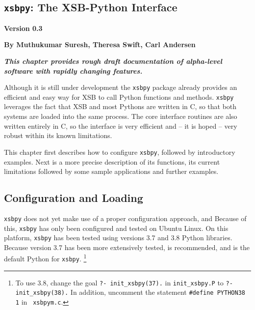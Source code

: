 \newcommand{\xsbpyversion}{Version 0.3}

\begin{center}
\chapter[XSB and Python]{{\tt xsbpy}: The XSB-Python Interface} \label{chap:xsbpy}
\end{center}

\vspace*{-.30in} 
\begin{center}
{\Large {\bf  \xsbpyversion}}
\end{center}

\begin{center}
  {\Large {\bf By Muthukumar Suresh, Theresa Swift, Carl Andersen}}
\end{center}

\noindent
{\large {\bf {\em This chapter provides rough draft documentation of
      alpha-level software with rapidly changing features.}}}

%

Although it is still under development the {\tt xsbpy} package already
provides an efficient and easy way for XSB to call Python functions
and methods.  {\tt xsbpy} leverages the fact that XSB and most Pythons
are written in C, so that both systems are loaded into the same
process. The core interface routines are also written entirely in C,
so the interface is very efficient and -- it is hoped -- very robust
within its known limitations.

This chapter first describes how to configure {\tt xsbpy}, followed by
introductory examples.  Next is a more precise description of its
functions, its current limitations followed by some sample
applications and further examples.

\section{Configuration and Loading}

{\tt xsbpy} does not yet make use of a proper configuration approach,
and Because of this, {\tt xsbpy} has only been configured and tested
on Ubuntu Linux.  On this platform, {\tt xsbpy} has been tested using
versions 3.7 and 3.8 Python libraries.  Because version 3.7 has been
more extensively tested, is recommended, and is the default Python for
{\tt xsbpy}. \footnote{To use 3.8, change the goal {\tt ?- init\_xsbpy(37).}
  in {\tt init\_xsbpy.P} to {\tt ?- init\_xsbpy(38).}  In addition,
  uncomment the statement {\tt \#define PYTHON38 1} in {\tt
    xsbpym.c}.}

